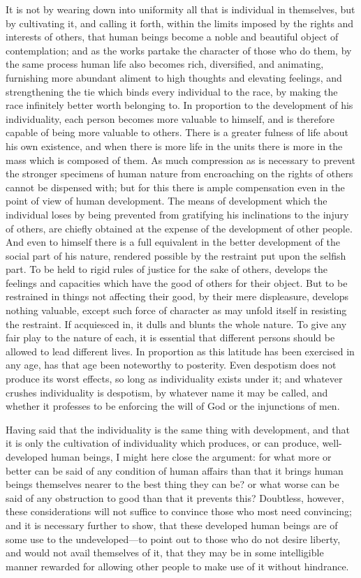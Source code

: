 \documentclass[11pt,openany]{book}
\begin{document}
It is not by wearing down into uniformity all that is individual in themselves, but by cultivating it, and calling it forth, within the limits imposed by the rights and interests of others, that human beings become a noble and beautiful object of contemplation; and as the works partake the character of those who do them, by the same process human life also becomes rich, diversified, and animating, furnishing more abundant aliment to high thoughts and elevating feelings, and strengthening the tie which binds every individual to the race, by making the race infinitely better worth belonging to. In proportion to the development of his individuality, each person becomes more valuable to himself, and is therefore capable of being more valuable to others. There is a greater fulness of life about his own existence, and when there is more life in the units there is more in the mass which is composed of them. As much compression as is necessary to prevent the stronger specimens of human nature from encroaching on the rights of others cannot be dispensed with; but for this there is ample compensation even in the point of view of human development. The means of development which the individual loses by being prevented from gratifying his inclinations to the injury of others, are chiefly obtained at the expense of the development of other people. And even to himself there is a full equivalent in the better development of the social part of his nature, rendered possible by the restraint put upon the selfish part. To be held to rigid rules of justice for the sake of others, develops the feelings and capacities which have the good of others for their object. But to be restrained in things not affecting their good, by their mere displeasure, develops nothing valuable, except such force of character as may unfold itself in resisting the restraint. If acquiesced in, it dulls and blunts the whole nature. To give any fair play to the nature of each, it is essential that different persons should be allowed to lead different lives. In proportion as this latitude has been exercised in any age, has that age been noteworthy to posterity. Even despotism does not produce its worst effects, so long as individuality exists under it; and whatever crushes individuality is despotism, by whatever name it may be called, and whether it professes to be enforcing the will of God or the injunctions of men.

Having said that the individuality is the same thing with development, and that it is only the cultivation of individuality which produces, or can produce, well-developed human beings, I might here close the argument: for what more or better can be said of any condition of human affairs than that it brings human beings themselves nearer to the best thing they can be? or what worse can be said of any obstruction to good than that it prevents this? Doubtless, however, these considerations will not suffice to convince those who most need convincing; and it is necessary further to show, that these developed human beings are of some use to the undeveloped---to point out to those who do not desire liberty, and would not avail themselves of it, that they may be in some intelligible manner rewarded for allowing other people to make use of it without hindrance.
\end{document}
